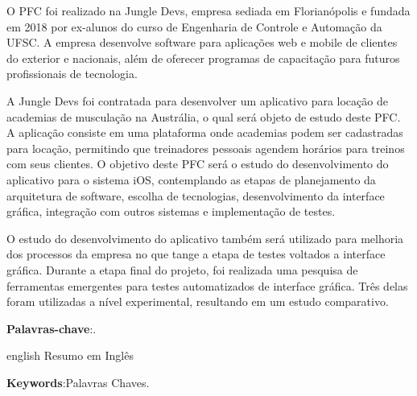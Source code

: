 

\setlength{\absparsep}{18pt} %
\begin{resumo}

O PFC foi realizado na Jungle Devs, empresa sediada em Florianópolis e fundada em 2018 por ex-alunos do curso de Engenharia de Controle e Automação da UFSC. A empresa desenvolve software para aplicações web e mobile de clientes do exterior e nacionais, além de oferecer programas de capacitação para futuros profissionais de tecnologia.

A Jungle Devs foi contratada para desenvolver um aplicativo para locação de academias de musculação na Austrália, o qual será objeto de estudo deste PFC. A aplicação consiste em uma plataforma onde academias podem ser cadastradas para locação, permitindo que treinadores pessoais agendem horários para treinos com seus clientes. O objetivo deste PFC será o estudo do desenvolvimento do aplicativo para o sistema iOS, contemplando as etapas de planejamento da arquitetura de software, escolha de tecnologias, desenvolvimento da interface gráfica, integração com outros sistemas e implementação de testes.

O estudo do desenvolvimento do aplicativo também será utilizado para melhoria dos processos da empresa no que tange a etapa de testes voltados a interface gráfica. Durante a etapa final do projeto, foi realizada uma pesquisa de ferramentas emergentes para testes automatizados de interface gráfica. Três delas foram utilizadas a nível experimental, resultando em um estudo comparativo.





 \textbf{Palavras-chave}:.
\end{resumo}


\begin{resumo}[Abstract]
 \begin{otherlanguage*}{english}
Resumo em Inglês
   \vspace{\onelineskip}
 
   \noindent 
   \textbf{Keywords}:Palavras Chaves.
 \end{otherlanguage*}
\end{resumo}
